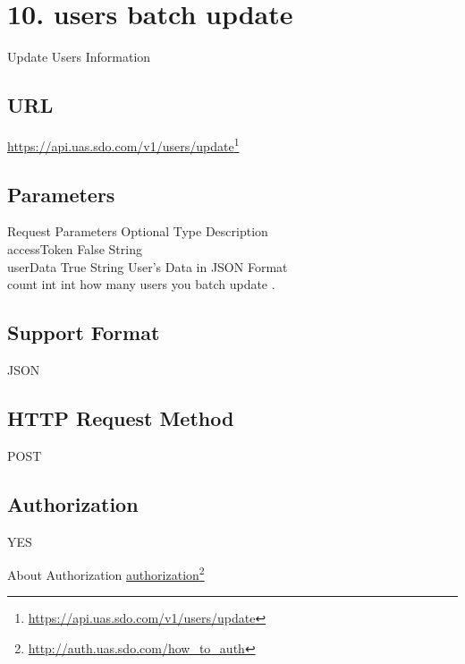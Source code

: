 \chapter{10. users batch update}
\label{usersbatchupdate}

Update Users Information

\section{URL}
\label{url}

\href{https://api.uas.sdo.com/v1/users/update}{https:/\slash api.uas.sdo.com\slash v1\slash users\slash update}\footnote{\href{https://api.uas.sdo.com/v1/users/update}{https:/\slash api.uas.sdo.com\slash v1\slash users\slash update}}

\section{Parameters}
\label{parameters}

Request Parameters \textbar{} Optional \textbar{} Type \textbar{} Description\\
accessToken \textbar{} False \textbar{} String \textbar{}\\
userData \textbar{} True \textbar{} String \textbar{} User's Data in JSON Format\\
count \textbar{} int \textbar{} int \textbar{} how many users you batch update . 

\section{Support Format}
\label{supportformat}

JSON

\section{HTTP Request Method}
\label{httprequestmethod}

POST

\section{Authorization}
\label{authorization}

YES

About Authorization \href{http://auth.uas.sdo.com/how_to_auth}{authorization}\footnote{\href{http://auth.uas.sdo.com/how_to_auth}{http:/\slash auth.uas.sdo.com\slash how\_to\_auth}}

